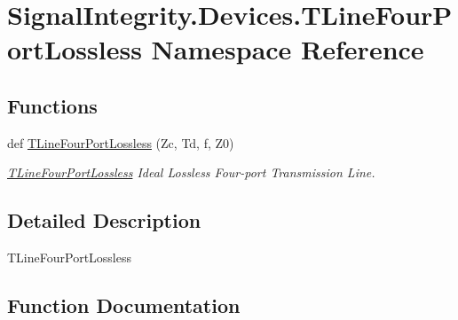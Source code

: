 \hypertarget{namespaceSignalIntegrity_1_1Devices_1_1TLineFourPortLossless}{}\section{Signal\+Integrity.\+Devices.\+T\+Line\+Four\+Port\+Lossless Namespace Reference}
\label{namespaceSignalIntegrity_1_1Devices_1_1TLineFourPortLossless}
\subsection*{Functions}
\begin{DoxyCompactItemize}
\item 
def \hyperlink{namespaceSignalIntegrity_1_1Devices_1_1TLineFourPortLossless_a1eacb2d951a947630c694ea6e3d6754b}{T\+Line\+Four\+Port\+Lossless} (Zc, Td, f, Z0)
\begin{DoxyCompactList}\small\item\em \hyperlink{namespaceSignalIntegrity_1_1Devices_1_1TLineFourPortLossless}{T\+Line\+Four\+Port\+Lossless} Ideal Lossless Four-\/port Transmission Line. \end{DoxyCompactList}\end{DoxyCompactItemize}


\subsection{Detailed Description}
\begin{DoxyVerb}TLineFourPortLossless\end{DoxyVerb}
 

\subsection{Function Documentation}
\mbox{\label{namespaceSignalIntegrity_1_1Devices_1_1TLineFourPortLossless_a1eacb2d951a947630c694ea6e3d6754b}} 
